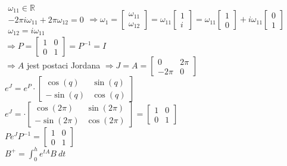 $\begin{array}{r}\omega_{11} \in \mathbb{R}\\
-2\pi i \omega_{11}+2\pi \omega_{12}=0\\
\omega_{12}=i\omega_{11}\end{array} \Rightarrow \omega_1=\left[ \begin{array}{c}     \omega_{11}\\\omega_{12}    \end{array}\right]=
\omega_{11}\left[ \begin{array}{c}     1\\i    \end{array}\right]=
\omega_{11}\left[ \begin{array}{c}     1\\0    \end{array}\right]+ i\omega_{11}\left[ \begin{array}{c}     0\\1    \end{array}\right]$\\
$\Rightarrow P=\left[ \begin{array}{cc}     1&0\\0&1    \end{array}\right]=P^{-1}=I$\\
$\Rightarrow A$ jest postaci Jordana $\Rightarrow J=A=\left[ \begin{array}{cc}     0&2\pi\\-2\pi&0    \end{array}\right]$\\
$e^J=e^P \cdot\left[ \begin{array}{cc}     \cos(q)&\sin(q)\\-\sin(q)& \cos(q)   \end{array}\right]$\\
$e^J= \cdot\left[ \begin{array}{cc}     \cos(2\pi)&\sin(2\pi)\\-\sin(2\pi)& \cos(2\pi)   \end{array}\right]=\left[ \begin{array}{cc}     1&0\\0& 1   \end{array}\right]$\\
$Pe^JP^{-1}=\left[ \begin{array}{cc}     1&0\\0& 1   \end{array}\right]$\\
$B^+=\int^h_0e^{tA}B \ dt$\\
